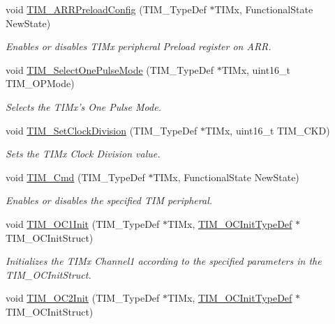 \begin{DoxyCompactItemize}
void \hyperlink{group___t_i_m_ga42b44b9fc2b0798d733720dd6bac1ac0}{T\-I\-M\-\_\-\-A\-R\-R\-Preload\-Config} (T\-I\-M\-\_\-\-Type\-Def $\ast$T\-I\-Mx, Functional\-State New\-State)
\begin{DoxyCompactList}\small\item\em Enables or disables T\-I\-Mx peripheral Preload register on A\-R\-R. \end{DoxyCompactList}\item 
void \hyperlink{group___t_i_m_gadd2cca5fac6c1291dc4339098d5c9562}{T\-I\-M\-\_\-\-Select\-One\-Pulse\-Mode} (T\-I\-M\-\_\-\-Type\-Def $\ast$T\-I\-Mx, uint16\-\_\-t T\-I\-M\-\_\-\-O\-P\-Mode)
\begin{DoxyCompactList}\small\item\em Selects the T\-I\-Mx's One Pulse Mode. \end{DoxyCompactList}\item 
void \hyperlink{group___t_i_m_ga20ef804dc32c723662d11ee7da3baab2}{T\-I\-M\-\_\-\-Set\-Clock\-Division} (T\-I\-M\-\_\-\-Type\-Def $\ast$T\-I\-Mx, uint16\-\_\-t T\-I\-M\-\_\-\-C\-K\-D)
\begin{DoxyCompactList}\small\item\em Sets the T\-I\-Mx Clock Division value. \end{DoxyCompactList}\item 
void \hyperlink{group___t_i_m_ga2bdc275bcbd2ce9d1ba632e6c89896b7}{T\-I\-M\-\_\-\-Cmd} (T\-I\-M\-\_\-\-Type\-Def $\ast$T\-I\-Mx, Functional\-State New\-State)
\begin{DoxyCompactList}\small\item\em Enables or disables the specified T\-I\-M peripheral. \end{DoxyCompactList}\item 
void \hyperlink{group___t_i_m_gafcdb6ff00158862aef7fed5e7a554a3e}{T\-I\-M\-\_\-\-O\-C1\-Init} (T\-I\-M\-\_\-\-Type\-Def $\ast$T\-I\-Mx, \hyperlink{struct_t_i_m___o_c_init_type_def}{T\-I\-M\-\_\-\-O\-C\-Init\-Type\-Def} $\ast$T\-I\-M\-\_\-\-O\-C\-Init\-Struct)
\begin{DoxyCompactList}\small\item\em Initializes the T\-I\-Mx Channel1 according to the specified parameters in the T\-I\-M\-\_\-\-O\-C\-Init\-Struct. \end{DoxyCompactList}\item 
void \hyperlink{group___t_i_m_ga2017455121d910d6ff63ac6f219842c5}{T\-I\-M\-\_\-\-O\-C2\-Init} (T\-I\-M\-\_\-\-Type\-Def $\ast$T\-I\-Mx, \hyperlink{struct_t_i_m___o_c_init_type_def}{T\-I\-M\-\_\-\-O\-C\-Init\-Type\-Def} $\ast$T\-I\-M\-\_\-\-O\-C\-Init\-Struct)

\end{DoxyCompactItemize}
